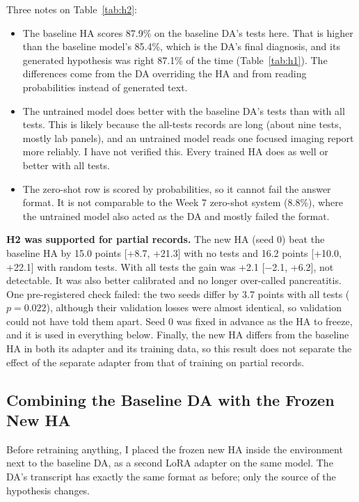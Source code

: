 \documentclass[11pt]{article}
\begin{document}
Three notes on Table~\ref{tab:h2}:
\begin{itemize}
  \item The baseline HA scores 87.9\% on the baseline DA's tests here. That is
        higher than the baseline model's 85.4\%, which is the DA's final diagnosis,
        and its generated hypothesis was right 87.1\% of the time (Table~\ref{tab:h1}).
        The differences come from the DA overriding the HA and from reading
        probabilities instead of generated text.
  \item The untrained model does better with the baseline DA's tests than with
        all tests. This is likely because the all-tests records are long (about
        nine tests, mostly lab panels), and an untrained model reads one
        focused imaging report more reliably. I have not verified this. Every
        trained HA does as well or better with all tests.
  \item The zero-shot row is scored by probabilities, so it cannot fail the
        answer format. It is not comparable to the Week 7 zero-shot system
        (8.8\%), where the untrained model also acted as the DA and mostly
        failed the format.
\end{itemize}

\textbf{H2 was supported for partial records.} The new HA (seed 0) beat the baseline
HA by 15.0 points [+8.7, +21.3] with no tests and 16.2 points [+10.0, +22.1]
with random tests. With all tests the gain was +2.1 [$-$2.1, +6.2], not
detectable. It was also better calibrated and no longer over-called
pancreatitis. One pre-registered check failed: the two seeds differ by 3.7
points with all tests ($p = 0.022$), although their validation losses were
almost identical, so validation could not have told them apart. Seed 0 was
fixed in advance as the HA to freeze, and it is used in everything below. Finally,
the new HA differs from the baseline HA in both its adapter and its training data, so
this result does not separate the effect of the separate adapter from that of
training on partial records.

\subsection*{Combining the Baseline DA with the Frozen New HA}

Before retraining anything, I placed the frozen new HA inside the environment
next to the baseline DA, as a second LoRA adapter on the same model. The DA's
transcript has exactly the same format as before; only the source of the
hypothesis changes.
\end{document}
